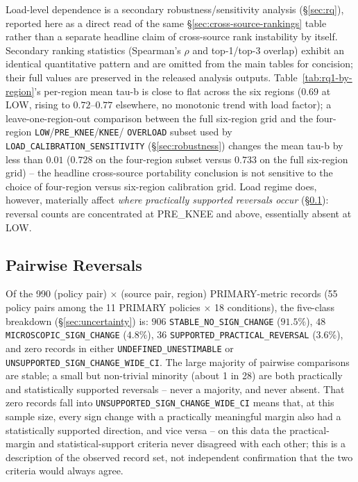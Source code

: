 Load-level dependence is a secondary robustness/sensitivity analysis
(\S\ref{sec:rq}), reported here as a direct read of the same
\S\ref{sec:cross-source-rankings} table rather than a separate headline
claim of cross-source rank instability by itself. Secondary ranking statistics (Spearman's $\rho$ and top-1/top-3 overlap) exhibit an identical quantitative pattern and are omitted from the main tables for concision; their full values are preserved in the released analysis outputs. Table~\ref{tab:rq1-by-region}'s
per-region mean tau-b is close to flat across the six regions ($0.69$ at
LOW, rising to $0.72$--$0.77$ elsewhere, no monotonic trend with load
factor); a leave-one-region-out comparison between the full six-region
grid and the four-region \texttt{LOW}/\texttt{PRE\_KNEE}/\texttt{KNEE}/
\texttt{OVERLOAD} subset used by \texttt{LOAD\_CALIBRATION\_SENSITIVITY}
(\S\ref{sec:robustness}) changes the mean tau-b by less than $0.01$
($0.728$ on the four-region subset versus $0.733$ on the full six-region
grid) -- the headline cross-source portability conclusion is not sensitive
to the choice of four-region versus six-region calibration grid. Load
regime does, however, materially affect \emph{where practically supported
reversals occur} (\S\ref{sec:reversals}): reversal counts are concentrated
at PRE\_KNEE and above, essentially absent at LOW.

\subsection{Pairwise Reversals}
\label{sec:reversals}

Of the 990 (policy pair) $\times$ (source pair, region) PRIMARY-metric
records (55 policy pairs among the 11 PRIMARY policies $\times$ 18
conditions), the
five-class breakdown (\S\ref{sec:uncertainty}) is: $906$
\texttt{STABLE\_NO\_SIGN\_CHANGE} ($91.5\%$), $48$
\texttt{MICROSCOPIC\_SIGN\_CHANGE} ($4.8\%$), $36$
\texttt{SUPPORTED\_PRACTICAL\_REVERSAL} ($3.6\%$), and zero records in
either \texttt{UNDEFINED\_UNESTIMABLE} or
\texttt{UNSUPPORTED\_SIGN\_CHANGE\_WIDE\_CI}. The large majority of
pairwise comparisons are stable; a small but non-trivial minority (about 1
in 28) are both practically and statistically supported reversals -- never
a majority, and never absent. That zero records fall into
\texttt{UNSUPPORTED\_SIGN\_CHANGE\_WIDE\_CI} means that, at this sample
size, every sign change with a practically meaningful margin also had a
statistically supported direction, and vice versa -- on this data the
practical-margin and statistical-support criteria never disagreed with each
other; this is a description of the observed record set, not independent
confirmation that the two criteria would always agree.

